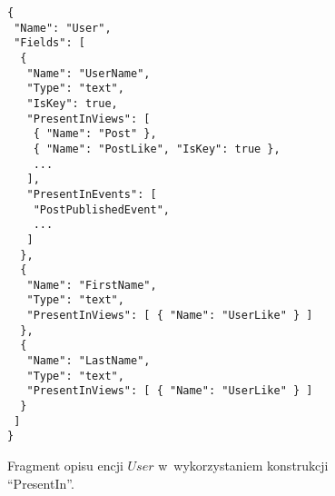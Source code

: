 \begin{figure}[!ht]
\begin{verbatim}
{
 "Name": "User",
 "Fields": [
  {
   "Name": "UserName",
   "Type": "text",
   "IsKey": true,
   "PresentInViews": [
    { "Name": "Post" },
    { "Name": "PostLike", "IsKey": true },
    ...
   ],
   "PresentInEvents": [
    "PostPublishedEvent",
    ...
   ]
  },
  {
   "Name": "FirstName",
   "Type": "text",
   "PresentInViews": [ { "Name": "UserLike" } ]
  },
  {
   "Name": "LastName",
   "Type": "text",
   "PresentInViews": [ { "Name": "UserLike" } ]
  }
 ]
}
\end{verbatim}
\caption{Fragment opisu encji $User$ w~wykorzystaniem konstrukcji ``PresentIn''.}
\label{fig:single:model_presentIn}
\end{figure}
